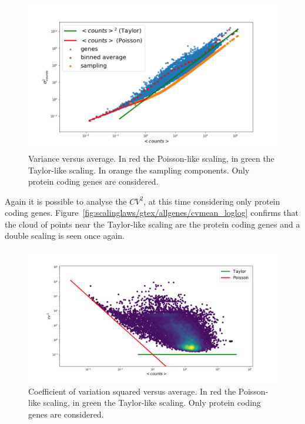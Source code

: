 \begin{figure}[htb!]
    \centering
    \includegraphics[width=0.9\linewidth]{pictures/scalinglaws/gtex/varmean_3sigma.png}
    \caption{Variance versus average. In \textcolor{pythonred}{red} the Poisson-like scaling, in \textcolor{pythongreen}{green} the Taylor-like scaling. In \textcolor{pythonorange}{orange} the sampling components. Only protein coding genes are considered.}
    \label{fig:scalinglaws/gtex/varmean_3sigma}
\end{figure}

Again it is possible to analyse the $CV^2$, at this time considering only protein coding genes. Figure~\ref{fig:scalinglaws/gtex/allgenes/cvmean_loglog} confirms that the cloud of points near the Taylor-like scaling are the protein coding genes and a double scaling is seen once again.
\begin{figure}[htb!]
    \centering
    \includegraphics[width=0.9\linewidth]{pictures/scalinglaws/gtex/cvmean_loglog_density.png}
    \caption{Coefficient of variation squared versus average. In \textcolor{pythonred}{red} the Poisson-like scaling, in \textcolor{pythongreen}{green} the Taylor-like scaling. Only protein coding genes are considered.}
    \label{fig:scalinglaws/gtex/cvmean_loglog}
\end{figure}

